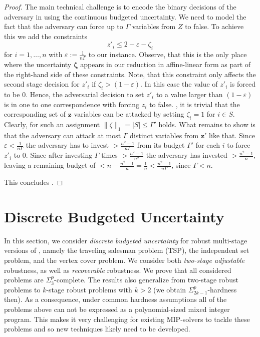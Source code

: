 \begin{proof}
    The main technical challenge is to encode the binary decisions of the adversary 
    in {\radj} using the continuous budgeted uncertainty.
    We need to model the fact that the adversary can force up to $\Gamma$ variables from $Z$ to false.
    To achieve this we add the constraints
    \[ z'_i \leq 2 - \varepsilon - \zeta_i \]
    for $i=1,\dots,n$ with $\varepsilon := \frac{1}{n \Gamma}$ to our instance.
    Observe, that this is the only place where the uncertainty $\pmb{\zeta}$ appears in our 
    reduction  in affine-linear form as part of the right-hand side of these constraints.
    Note, that this constraint only affects the second stage decision for $z'_i$ if 
    $\zeta_i > (1-\varepsilon)$. In this case the value of $z'_i$ is forced to be $0$. Hence, the adversarial decision to set $z'_i$ to a value larger 
    than $(1-\varepsilon)$ is in one to one correspondence with forcing $z_i$ to false.
    ,
    it is trivial that the corresponding set of $\pmb{z}$ variables can be attacked by 
    setting $\zeta_i = 1$ for $i \in S$. Clearly, for such an assignment  $\| \zeta \|_1 = |S| \leq \Gamma'$ holds.
    What remains to show is that the adversary can attack at most $\Gamma$ distinct 
    variables from $\pmb{z}'$ like that.
    Since $\varepsilon < \frac{1}{n \Gamma}$ the adversary has to invest $ > \frac{n^2-1}{n \Gamma}$ from its budget $\Gamma'$ for each $i$ to
    force $z'_i$ to $0$.
    Since after investing $\Gamma$ times $ > \frac{n^2-1}{n^2}$ the adversary has invested $> \frac{n^2-1}{n}$,
    leaving a remaining budget of $< n - \frac{n^2-1}{n} = \frac{1}{n} < \frac{n^2-1}{n \Gamma}$, since $\Gamma < n$.

    This concludes .
\end{proof}


\section{Discrete Budgeted Uncertainty}
\label{sec:discbudgeted}

In this section, we consider \emph{discrete budgeted uncertainty} for robust multi-stage versions of , namely the traveling salesman problem (TSP), the independent set problem, and the vertex cover problem. We consider both \emph{two-stage adjustable} robustness, as well as \emph{recoverable} robustness. We prove that all considered problems are $\Sigma_3^p$-complete. The results also generalize from two-stage robust problems to $k$-stage robust problems with $k > 2$ (we obtain $\Sigma^p_{2k-1}$-hardness then). As a consequence, under common hardness assumptions all of the problems above can not be expressed as a polynomial-sized mixed integer program. This makes it very challenging for existing MIP-solvers to tackle these problems and so new techniques likely need to be developed.

